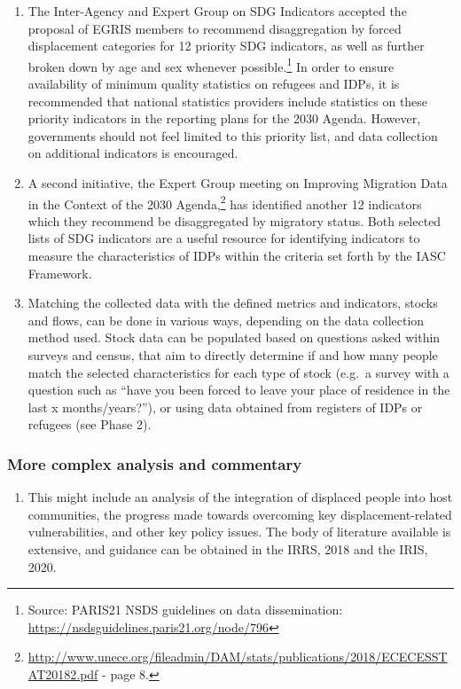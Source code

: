 \documentclass[
]{article}
\providecommand{\tightlist}{%
  \setlength{\itemsep}{0pt}\setlength{\parskip}{0pt}}
\begin{document}
\begin{enumerate}
\def\labelenumi{\arabic{enumi}.}
\setcounter{enumi}{424}
\item
  The Inter-Agency and Expert Group on SDG Indicators accepted the
  proposal of EGRIS members to recommend disaggregation by forced
  displacement categories for 12 priority SDG indicators, as well as
  further broken down by age and sex whenever possible.\footnote{Source: PARIS21 NSDS guidelines on data dissemination:
    \url{https://nsdsguidelines.paris21.org/node/796}} In order
  to ensure availability of minimum quality statistics on refugees and
  IDPs, it is recommended that national statistics providers include
  statistics on these priority indicators in the reporting plans for
  the 2030 Agenda. However, governments should not feel limited to
  this priority list, and data collection on additional indicators is
  encouraged.
\item
  A second initiative, the Expert Group meeting on Improving
  Migration Data in the Context of the 2030 Agenda,\footnote{\url{http://www.unece.org/fileadmin/DAM/stats/publications/2018/ECECESSTAT20182.pdf}
    - page 8.} has identified
  another 12 indicators which they recommend be disaggregated by
  migratory status. Both selected lists of SDG indicators are a useful
  resource for identifying indicators to measure the characteristics
  of IDPs within the criteria set forth by the IASC Framework.
\item
  Matching the collected data with the defined metrics and
  indicators, stocks and flows, can be done in various ways, depending
  on the data collection method used. Stock data can be populated
  based on questions asked within surveys and census, that aim to
  directly determine if and how many people match the selected
  characteristics for each type of stock (e.g.~a survey with a
  question such as ``have you been forced to leave your place of
  residence in the last x months/years?''), or using data obtained from
  registers of IDPs or refugees (see Phase 2).
\end{enumerate}

\hypertarget{more-complex-analysis-and-commentary}{%
\subsubsection{More complex analysis and commentary}\label{more-complex-analysis-and-commentary}}

\begin{enumerate}
\def\labelenumi{\arabic{enumi}.}
\setcounter{enumi}{427}
\tightlist
\item
  This might include an analysis of the integration of displaced
  people into host communities, the progress made towards overcoming
  key displacement-related vulnerabilities, and other key policy
  issues. The body of literature available is extensive, and guidance
  can be obtained in the IRRS, 2018 and the IRIS, 2020.
\end{enumerate}
\end{document}
